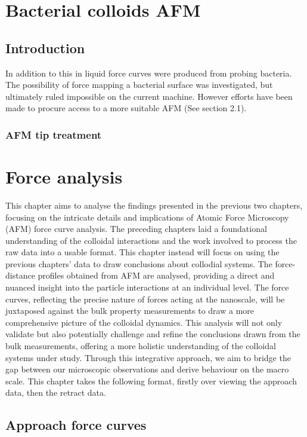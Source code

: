 \chapter{Bacterial colloids AFM}

\section{Introduction}

In addition to this in liquid force curves were produced from probing bacteria. The possibility of force mapping a bacterial surface was investigated, but ultimately ruled impossible on the current machine. However efforts have been made to procure access to a more suitable AFM (See section 2.1).

\subsection{AFM tip treatment} \chapter{Force analysis}

This chapter aims to analyse the findings presented in the previous two chapters, focusing on the intricate details and implications of Atomic Force Microscopy (AFM) force curve analysis. The preceding chapters laid a foundational understanding of the colloidal interactions and the work involved to process the raw data into a usable format. This chapter instead will focus on using the previous chapters' data to draw conclusions about collodial systems. The force-distance profiles obtained from AFM are analysed, providing a direct and nuanced insight into the particle interactions at an individual level. The force curves, reflecting the precise nature of forces acting at the nanoscale, will be juxtaposed against the bulk property measurements to draw a more comprehensive picture of the colloidal dynamics. This analysis will not only validate but also potentially challenge and refine the conclusions drawn from the bulk measurements, offering a more holistic understanding of the colloidal systems under study. Through this integrative approach, we aim to bridge the gap between our microscopic observations and derive behaviour on the macro scale. This chapter takes the following format, firstly over viewing the approach data, then the retract data.

\section{Approach force curves}



